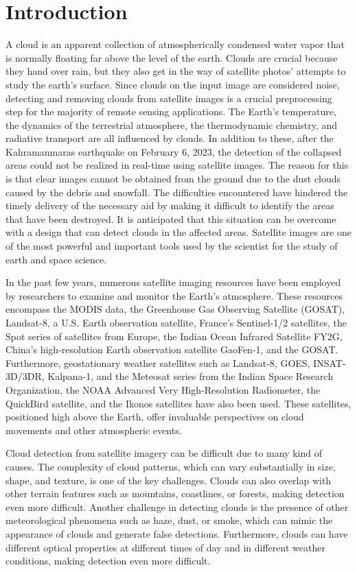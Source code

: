 \chapter{Introduction}
A cloud is an apparent collection of atmospherically condensed water vapor that is normally floating far above the level of the earth. Clouds are crucial because they hand over rain, but they also get in the way of satellite photos' attempts to study the earth's surface. Since clouds on the input image are considered noise, detecting and removing clouds from satellite images is a crucial preprocessing step for the majority of remote sensing applications. The Earth's temperature, the dynamics of the terrestrial atmosphere, the thermodynamic chemistry, and radiative transport are all influenced by clouds. In addition to these, after the Kahramanmaras earthquake on February 6, 2023, the detection of the collapsed areas could not be realized in real-time using satellite images. The reason for this is that clear images cannot be obtained from the ground due to the dust clouds caused by the debris and snowfall. The difficulties encountered have hindered the timely delivery of the necessary aid by making it difficult to identify the areas that have been destroyed. It is anticipated that this situation can be overcome with a design that can detect clouds in the affected areas. Satellite images are one of the most powerful and important tools used by the scientist for the study of earth and space science.

In the past few years, numerous satellite imaging resources have been employed by researchers to examine and monitor the Earth's atmosphere. These resources encompass the MODIS data, the Greenhouse Gas Observing Satellite (GOSAT), Landsat-8, a U.S. Earth observation satellite, France's Sentinel-1/2 satellites, the Spot series of satellites from Europe, the Indian Ocean Infrared Satellite FY2G, China's high-resolution Earth observation satellite GaoFen-1, and the GOSAT. Furthermore, geostationary weather satellites such as Landsat-8, GOES, INSAT-3D/3DR, Kalpana-1, and the Meteosat series from the Indian Space Research Organization, the NOAA Advanced Very High-Resolution Radiometer, the QuickBird satellite, and the Ikonos satellites have also been used. These satellites, positioned high above the Earth, offer invaluable perspectives on cloud movements and other atmospheric events.\cite{mahajan2020cloud}

Cloud detection from satellite imagery can be difficult due to many kind of causes. The complexity of cloud patterns, which can vary substantially in size, shape, and texture, is one of the key challenges. Clouds can also overlap with other terrain features such as mountains, coastlines, or forests, making detection even more difficult. Another challenge in detecting clouds is the presence of other meteorological phenomena such as haze, dust, or smoke, which can mimic the appearance of clouds and generate false detections. Furthermore, clouds can have different optical properties at different times of day and in different weather conditions, making detection even more difficult.

